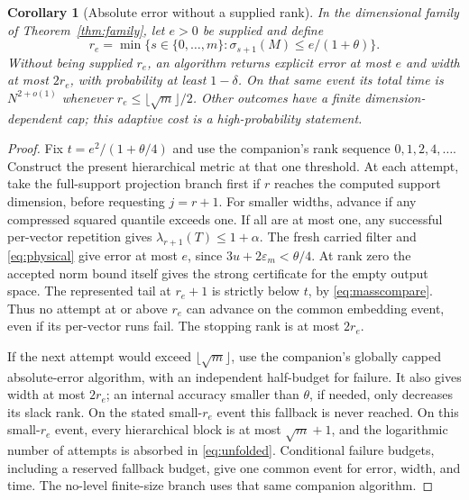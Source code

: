 \documentclass[11pt]{article}
\newtheorem{corollary}[theorem]{Corollary}
\begin{document}
\begin{corollary}[Absolute error without a supplied rank]\label{cor:absolute}
In the dimensional family of Theorem~\ref{thm:family}, let \(e>0\)
be supplied and define
\[
 r_e=\min\{s\in\{0,\ldots,m\}:\sigma_{s+1}(M)\leq e/(1+\theta)\}.
\]
Without being supplied \(r_e\), an algorithm returns explicit error at
most \(e\) and width at most \(2r_e\), with probability at least
\(1-\delta\). On that same event its total time is \(N^{2+o(1)}\)
whenever \(r_e\leq\lfloor\sqrt m\rfloor/2\). Other outcomes have
a finite dimension-dependent cap; this adaptive cost is a high-probability
statement.
\end{corollary}
\begin{proof}
Fix \(t=e^2/(1+\theta/4)\) and use the companion's rank sequence
\(0,1,2,4,\ldots\). Construct the present hierarchical metric at that
one threshold.
At each attempt, take the full-support projection branch first if
\(r\) reaches the computed support dimension, before requesting \(j=r+1\).
For smaller widths, advance if any compressed squared quantile exceeds
one. If all are at most one, any successful per-vector repetition gives
\(\lambda_{r+1}(T)\leq1+\alpha\). The fresh carried filter and
\eqref{eq:physical} give error at most \(e\), since
\(3u+2\varepsilon_m<\theta/4\). At rank zero the accepted norm
bound itself gives the strong certificate for the empty output space.
The represented tail at \(r_e+1\) is strictly below \(t\), by
\eqref{eq:masscompare}. Thus no attempt at or above \(r_e\) can
advance on the common embedding event, even if its per-vector runs
fail. The stopping rank is at most \(2r_e\).

If the next attempt would exceed \(\lfloor\sqrt m\rfloor\), use
the companion's globally capped absolute-error algorithm, with an
independent half-budget for failure. It also gives width at most
\(2r_e\); an internal accuracy smaller than \(\theta\), if needed,
only decreases its slack rank. On the stated small-\(r_e\) event this
fallback is never reached. On this small-\(r_e\) event, every hierarchical
block is at most \(\sqrt m+1\),
and the logarithmic number of attempts is absorbed in \eqref{eq:unfolded}.
Conditional failure budgets, including a reserved fallback budget, give
one common event for error, width, and time. The no-level finite-size
branch uses that same companion algorithm.
\end{proof}
\end{document}
